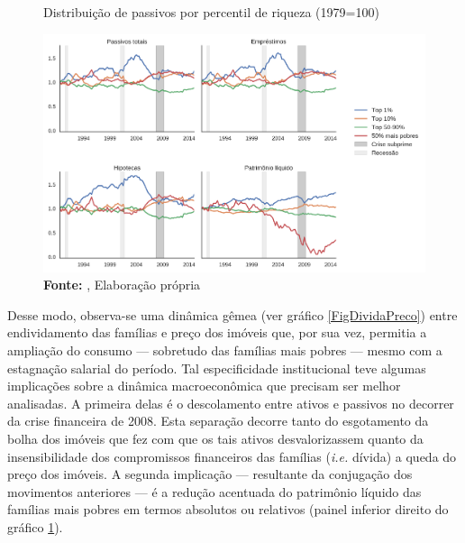 \begin{figure}[H]
	\centering
	\caption{Distribuição de passivos por percentil de riqueza (1979=100)}
	\label{FigDistPassivos}
	\includegraphics[width=\textwidth]{../../Dados/Fatos_Estilizados/figs/Distribuicao_Passivos.png}
	\caption*{\textbf{Fonte:} \textcite{us_census_bureau_characteristics_2017}, Elaboração própria}
\end{figure}


Desse modo, observa-se uma dinâmica gêmea (ver gráfico \ref{FigDividaPreco}) entre endividamento das famílias e preço dos imóveis que, por sua vez, permitia a ampliação do consumo --- sobretudo das famílias mais pobres --- mesmo com a estagnação salarial do período.
Tal especificidade institucional teve algumas implicações sobre a dinâmica macroeconômica que precisam ser melhor analisadas.
A primeira delas é o descolamento entre ativos e passivos no decorrer da crise financeira de 2008.
Esta separação decorre tanto do esgotamento da bolha dos imóveis que fez com que os tais ativos desvalorizassem quanto da insensibilidade dos compromissos financeiros das famílias (\textit{i.e.} dívida) a queda do preço dos imóveis.
A segunda implicação --- resultante da conjugação dos movimentos anteriores --- é a redução acentuada do patrimônio líquido das famílias mais pobres em termos absolutos ou relativos (painel inferior direito do gráfico \ref{FigDistPassivos}).




